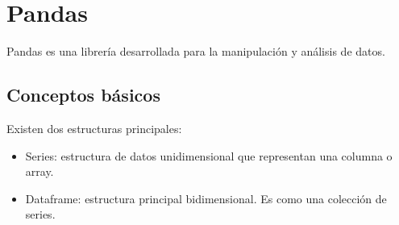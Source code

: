 \documentclass{./Programacion.tex}
\begin{document}
\section{Pandas}
Pandas es una librería desarrollada para la manipulación y análisis de datos.
\subsection{Conceptos básicos}
Existen dos estructuras principales:
\begin{itemize}
	\item Series: estructura de datos unidimensional que representan una columna o array.
	\item Dataframe: estructura principal bidimensional. Es como una colección de series.
\end{itemize}
\end{document}
